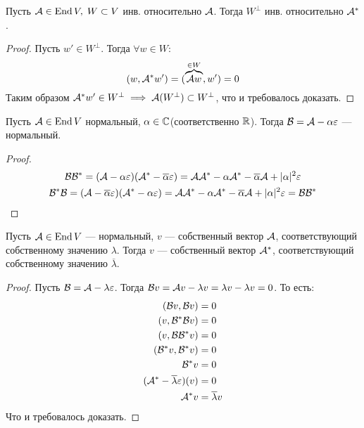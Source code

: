 \documentclass[../main.tex]{subfiles}
\begin{document}
\begin{theorem-non}
\label{non:8.17}
  Пусть $\mathcal{A} \in \operatorname{End} V,\; W \subset V$ инв. относительно $\mathcal{A}$. Тогда $W^\perp$ инв. относительно $\mathcal{A}^{*}$.
\end{theorem-non}
\begin{proof}
  Пусть $w' \in W^\perp$. Тогда $\forall w \in W$:
  \begin{equation*}
    (w, \mathcal{A}^{*} w') = (\overbrace{\mathcal{A} w}^{\in W}, w') = 0
  \end{equation*}
  Таким образом $\mathcal{A}^{*} w' \in W^\perp \implies \mathcal{A}(W^\perp) \subset W^\perp$, что и требовалось доказать.
\end{proof}

\begin{theorem-non}
  Пусть $\mathcal{A} \in \operatorname{End} V$ нормальный, $\alpha \in \mathbb{C}$(соответственно $\mathbb{R}$). Тогда $\mathcal{B} = \mathcal{A} - \alpha \varepsilon$ --- нормальный.
\end{theorem-non}
\begin{proof}
  \begin{equation*}
    \begin{gathered}
      \mathcal{B} \mathcal{B}^{*} = (\mathcal{A} - \alpha \varepsilon)(\mathcal{A}^{*} - \overline{\alpha}\varepsilon)
                = \mathcal{A} \mathcal{A}^{*} - \alpha \mathcal{A}^{*} - \overline{\alpha} \mathcal{A} + | \alpha |^2 \varepsilon \\
      \mathcal{B}^{*} \mathcal{B} = (\mathcal{A} - \overline{\alpha} \varepsilon)(\mathcal{A}^{*} - \alpha\varepsilon)
                = \mathcal{A} \mathcal{A}^{*} - \alpha \mathcal{A}^{*} - \overline{\alpha} \mathcal{A} + | \alpha |^2 \varepsilon = \mathcal{B} \mathcal{B}^{*}
    \end{gathered}
  \end{equation*}
\end{proof}

\begin{theorem-non}
\label{non:8.19}
  Пусть $\mathcal{A} \in \operatorname{End} V$ --- нормальный, $v$ --- собственный вектор $\mathcal{A}$, соответствующий собственному значению $\lambda$. Тогда $v$ --- собственный вектор $\mathcal{A}^{*}$, соответствующий собственному значению $\overline{\lambda}$.
\end{theorem-non}
\begin{proof}
  Пусть $\mathcal{B} = \mathcal{A} - \lambda \varepsilon$. Тогда $\mathcal{B} v = \mathcal{A} v - \lambda v = \lambda v - \lambda v = 0$. То есть:
  \begin{align*}
    (\mathcal{B} v, \mathcal{B} v) &= 0 \\
    (v, \mathcal{B}^{*} \mathcal{B} v) &= 0 \\
    (v, \mathcal{B} \mathcal{B}^{*} v) &= 0 \\
    (\mathcal{B}^{*} v, \mathcal{B}^{*} v) &= 0 \\
    \mathcal{B}^{*} v &= 0 \\
    (\mathcal{A}^{*} - \overline{\lambda} \varepsilon)(v) &= 0 \\
    \mathcal{A}^{*} v &= \overline{\lambda} v
  \end{align*}
  Что и требовалось доказать.
\end{proof}
\end{document}
